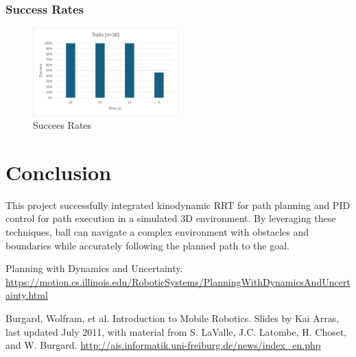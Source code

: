 \documentclass[12pt]{article}
\begin{document}
\subsubsection{Success Rates}
\begin{figure}[h!]
    \centering
    \includegraphics[width=0.5\textwidth]{./images/success.png}
    \caption{Succees Rates}
    \label{fig:Succees Rates}
\end{figure}

\section{Conclusion}
This project successfully integrated kinodynamic RRT for path planning and PID control for path execution in a simulated 3D environment. By leveraging these techniques, ball can navigate a complex environment with obstacles and boundaries while accurately following the planned path to the goal.

\begin{thebibliography}{}
\raggedright

Planning with Dynamics and Uncertainty. \href{https://motion.cs.illinois.edu/RoboticSystems/PlanningWithDynamicsAndUncertainty.html}
{https://motion.cs.illinois.edu/RoboticSystems/PlanningWithDynamicsAndUncertainty.html}

Burgard, Wolfram, et al. Introduction to Mobile Robotics. Slides by Kai Arras, last updated July 2011, with material from S. LaValle, J.C. Latombe, H. Choset, and W. Burgard. \href{http://ais.informatik.uni-freiburg.de/news/index_en.php}{http://ais.informatik.uni-freiburg.de/news/index\_en.php}


\end{thebibliography}
\end{document}
